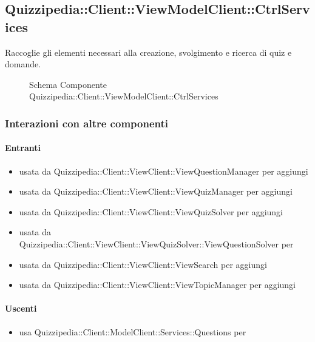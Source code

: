 \subsection{Quizzipedia::Client::ViewModelClient::CtrlServices}
Raccoglie gli elementi necessari alla creazione, svolgimento e ricerca di quiz e domande.
\begin{figure}[H]
\centering
\noindent{}
\caption[Schema Componente Quizzipedia::Client::ViewModelClient::CtrlServices]{Schema Componente Quizzipedia::Client::ViewModelClient::CtrlServices}
\end{figure}
\subsubsection{Interazioni con altre componenti}
\paragraph{Entranti}
\begin{itemize}
\item usata da Quizzipedia::Client::ViewClient::ViewQuestionManager per aggiungi
\item usata da Quizzipedia::Client::ViewClient::ViewQuizManager per aggiungi
\item usata da Quizzipedia::Client::ViewClient::ViewQuizSolver per aggiungi
\item usata da Quizzipedia::Client::ViewClient::ViewQuizSolver::ViewQuestionSolver per 
\item usata da Quizzipedia::Client::ViewClient::ViewSearch per aggiungi
\item usata da Quizzipedia::Client::ViewClient::ViewTopicManager per aggiungi
\end{itemize}
\paragraph{Uscenti}
\begin{itemize}
\item usa Quizzipedia::Client::ModelClient::Services::Questions per 
\end{itemize}
